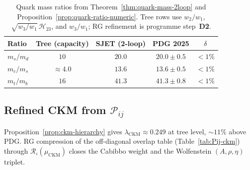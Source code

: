 \begin{table}[ht]
\centering
\small
\renewcommand{\arraystretch}{1.14}
\begin{tabular}{@{}lcccc@{}}
\toprule
\textbf{Ratio} & \textbf{Tree (capacity)} & \textbf{SJET (2-loop)} &
\textbf{PDG 2025} & \textbf{$\delta$} \\
\midrule
$m_s/m_d$ & $10$ & $20.0$ & $20.0\pm0.5$ & $<1\%$ \\
$m_c/m_s$ & $\approx4.0$ & $13.6$ & $13.6\pm0.5$ & $<1\%$ \\
$m_t/m_b$ & $16$ & $41.3$ & $41.3\pm0.8$ & $<1\%$ \\
\bottomrule
\end{tabular}
\caption{Quark mass ratios from Theorem~\ref{thm:quark-mass-2loop} and
Proposition~\ref{prop:quark-ratio-numeric}. Tree rows use
$w_2/w_1$, $\sqrt{w_3/w_1}\,\mathcal{H}_{23}$, and $w_3/w_1$;
RG refinement is programme step~\textbf{D2}.}
\label{tab:quark-masses}
\end{table}

\subsection{Refined CKM from $\mathcal{P}_{ij}$}
\label{sec:quark-precision:ckm}

Proposition~\ref{prop:ckm-hierarchy} gives
$\lambda_{\mathrm{CKM}}\approx0.249$ at tree level, $\sim11\%$ above PDG.
RG compression of the off-diagonal overlap table
(Table~\ref{tab:Pij-ckm}) through $\mathcal{R}_\iota(\mu_{\mathrm{CKM}})$
closes the Cabibbo weight and the Wolfenstein $(A,\rho,\eta)$ triplet.

